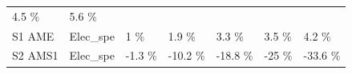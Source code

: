 \documentclass[]{article}
\begin{document}
\begin{longtable}[]{@{}lllllll@{}}
\begin{minipage}[t]{0.11\columnwidth}
4.5 \%\strut
\end{minipage} & \begin{minipage}[t]{0.11\columnwidth}\raggedright\strut
5.6 \%\strut
\end{minipage}\tabularnewline
\begin{minipage}[t]{0.14\columnwidth}\raggedright\strut
S1 AME\strut
\end{minipage} & \begin{minipage}[t]{0.13\columnwidth}\raggedright\strut
Elec\_spe\strut
\end{minipage} & \begin{minipage}[t]{0.11\columnwidth}\raggedright\strut
1 \%\strut
\end{minipage} & \begin{minipage}[t]{0.11\columnwidth}\raggedright\strut
1.9 \%\strut
\end{minipage} & \begin{minipage}[t]{0.11\columnwidth}\raggedright\strut
3.3 \%\strut
\end{minipage} & \begin{minipage}[t]{0.11\columnwidth}\raggedright\strut
3.5 \%\strut
\end{minipage} & \begin{minipage}[t]{0.11\columnwidth}\raggedright\strut
4.2 \%\strut
\end{minipage}\tabularnewline
\begin{minipage}[t]{0.14\columnwidth}\raggedright\strut
S2 AMS1\strut
\end{minipage} & \begin{minipage}[t]{0.13\columnwidth}\raggedright\strut
Elec\_spe\strut
\end{minipage} & \begin{minipage}[t]{0.11\columnwidth}\raggedright\strut
-1.3 \%\strut
\end{minipage} & \begin{minipage}[t]{0.11\columnwidth}\raggedright\strut
-10.2 \%\strut
\end{minipage} & \begin{minipage}[t]{0.11\columnwidth}\raggedright\strut
-18.8 \%\strut
\end{minipage} & \begin{minipage}[t]{0.11\columnwidth}\raggedright\strut
-25 \%\strut
\end{minipage} & \begin{minipage}[t]{0.11\columnwidth}\raggedright\strut
-33.6 \%\strut
\end{minipage}\tabularnewline

\end{longtable}
\end{document}
